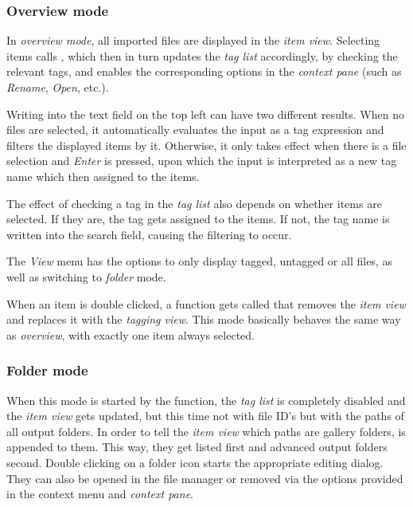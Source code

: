\subsubsection{Overview mode}

In \emph{overview mode}, all imported files are displayed in the \emph{item view}. Selecting items calls , which then in turn updates the \emph{tag list} accordingly, by checking the relevant tags, and enables the corresponding options in the \emph{context pane} (such as \emph{Rename}, \emph{Open}, etc.). 

Writing into the text field on the top left can have two different results. When no files are selected, it automatically evaluates the input as a tag expression and filters the displayed items by it. Otherwise, it only takes effect when there is a file selection and \emph{Enter} is pressed, upon which the input is interpreted as  a new tag name which then assigned to the items. 

The effect of checking a tag in the \emph{tag list} also depends on whether items are selected. If they are, the tag gets assigned to the items. If not, the tag name is written into the search field, causing the filtering to occur.

The \emph{View} menu has the options to only display tagged, untagged or all files, as well as switching to \emph{folder} mode.

When an item is double clicked, a function gets called that removes the \emph{item view} and replaces it with the \emph{tagging view}. This mode basically behaves the same way as \emph{overview}, with exactly one item always selected.

\subsubsection{Folder mode}
When this mode is started by the  function, the \emph{tag list} is completely disabled and the \emph{item view} gets updated, but this time not with file ID's but with the paths of all output folders. In order to tell the \emph{item view} which paths are gallery folders,  is appended to them. This way, they get listed first and advanced output folders second. Double clicking on a folder icon starts the appropriate editing dialog. They can also be opened in the file manager or removed via the options provided in the context menu and \emph{context pane}.

